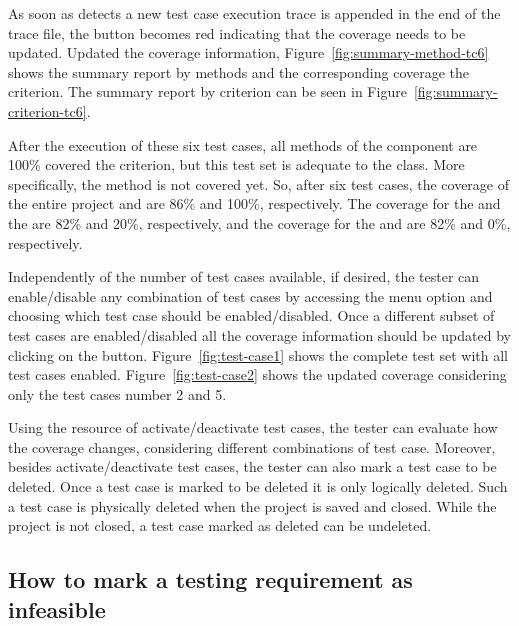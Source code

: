 As soon as \toolname detects a new test case execution trace is
appended in the end of the trace file, the  button
becomes red indicating that the coverage needs to be updated.
Updated the coverage information,
Figure~\ref{fig:summary-method-tc6} shows the summary report by
methods and the corresponding coverage \wrt the 
criterion. The summary report by criterion can be seen in
Figure~\ref{fig:summary-criterion-tc6}.





After the execution of these six test cases, all methods of the
 component are 100\% covered \wrt the
 criterion, but this test set is adequate to the
 class. More specifically, the
 method is not covered yet. So,
after six test cases, the coverage of the entire project \wrt
{} and  are 86\% and 100\%,
respectively. The coverage for the  and the
 are 82\% and 20\%, respectively, and the
coverage for the  and  are 82\%
and 0\%, respectively.

Independently of the number of test cases available, if desired,
the tester can enable/disable any combination of test cases by
accessing the 
menu option and choosing which test case should be
enabled/disabled. Once a different subset of test cases are
enabled/disabled all the coverage information should be updated by
clicking on the  button. Figure~\ref{fig:test-case1}
shows the complete test set with all test cases enabled.
Figure~\ref{fig:test-case2} shows the updated coverage considering
only the test cases number 2 and 5.



Using the resource of activate/deactivate test cases, the tester
can evaluate how the coverage changes, considering different
combinations of test case. Moreover, besides activate/deactivate
test cases, the tester can also mark a test case to be deleted.
Once a test case is marked to be deleted it is only logically
deleted. Such a test case is physically deleted when the project
is saved and closed. While the project is not closed, a test case
marked as deleted can be undeleted.

\afterpage{\clearpage}
\newpage

\subsection{How to mark a testing requirement as infeasible}

